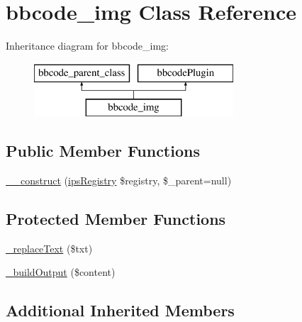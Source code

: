 \hypertarget{classbbcode__img}{\section{bbcode\-\_\-img Class Reference}
\label{classbbcode__img}
}
Inheritance diagram for bbcode\-\_\-img\-:\begin{figure}[H]
\begin{center}
\leavevmode
\includegraphics[height=2.000000cm]{classbbcode__img}
\end{center}
\end{figure}
\subsection*{Public Member Functions}
\begin{DoxyCompactItemize}
\item 
\hyperlink{classbbcode__img_a9c7a683aed4631ab88876012e950f1ab}{\-\_\-\-\_\-construct} (\hyperlink{classips_registry}{ips\-Registry} \$registry, \$\-\_\-parent=null)
\end{DoxyCompactItemize}
\subsection*{Protected Member Functions}
\begin{DoxyCompactItemize}
\item 
\hyperlink{classbbcode__img_a5001c42193db0c30308d9a3f17ccd950}{\-\_\-replace\-Text} (\$txt)
\item 
\hyperlink{classbbcode__img_afe580e670a227bab1f31432dfa79f5d4}{\-\_\-build\-Output} (\$content)
\end{DoxyCompactItemize}
\subsection*{Additional Inherited Members}


